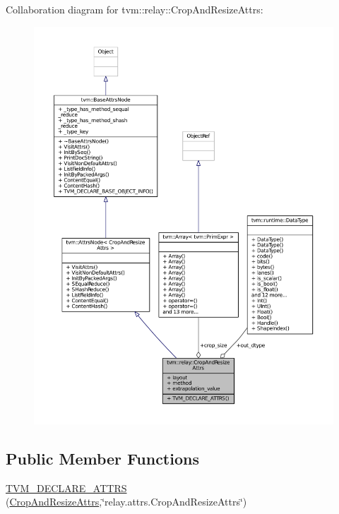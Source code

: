Collaboration diagram for tvm\+:\+:relay\+:\+:Crop\+And\+Resize\+Attrs\+:
\nopagebreak
\begin{figure}[H]
\begin{center}
\leavevmode
\includegraphics[width=350pt]{structtvm_1_1relay_1_1CropAndResizeAttrs__coll__graph}
\end{center}
\end{figure}
\subsection*{Public Member Functions}
\begin{DoxyCompactItemize}
\item 
\hyperlink{structtvm_1_1relay_1_1CropAndResizeAttrs_a9fba1a0bb07c466e4a507019db9fc171}{T\+V\+M\+\_\+\+D\+E\+C\+L\+A\+R\+E\+\_\+\+A\+T\+T\+RS} (\hyperlink{structtvm_1_1relay_1_1CropAndResizeAttrs}{Crop\+And\+Resize\+Attrs},\char`\"{}relay.\+attrs.\+Crop\+And\+Resize\+Attrs\char`\"{})
\end{DoxyCompactItemize}
